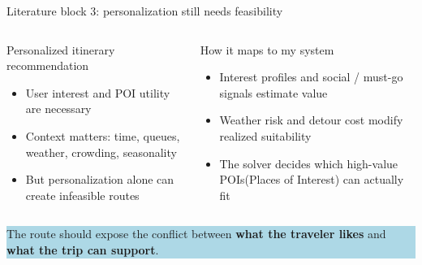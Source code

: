 \documentclass[aspectratio=169,10pt]{beamer}
\newcommand{\smallcite}[1]{\vspace{0.15em}{\footnotesize\textcolor{DarkGray}{#1}}}
\begin{document}
\begin{frame}{Literature block 3: personalization still needs feasibility}
\begin{columns}[T,onlytextwidth]
\begin{block}{Personalized itinerary recommendation}
\begin{itemize}
  \item User interest and POI utility are necessary
  \item Context matters: time, queues, weather, crowding, seasonality
  \item But personalization alone can create infeasible routes
\end{itemize}
\smallcite{Zhou et al. 2017; Lim et al. 2017; Halder et al. 2024}
\end{block}

\begin{block}{How it maps to my system}
\begin{itemize}
  \item Interest profiles and social / must-go signals estimate value
  \item Weather risk and detour cost modify realized suitability
  \item The solver decides which high-value POIs(Places of Interest) can actually fit
\end{itemize}
\end{block}
\end{columns}

\vspace{0.5em}
\centering
\colorbox{LightBlue}{\parbox{0.88\textwidth}{\centering\small The route should expose the conflict between \textbf{what the traveler likes} and \textbf{what the trip can support}.}}
\end{frame}
\end{document}
